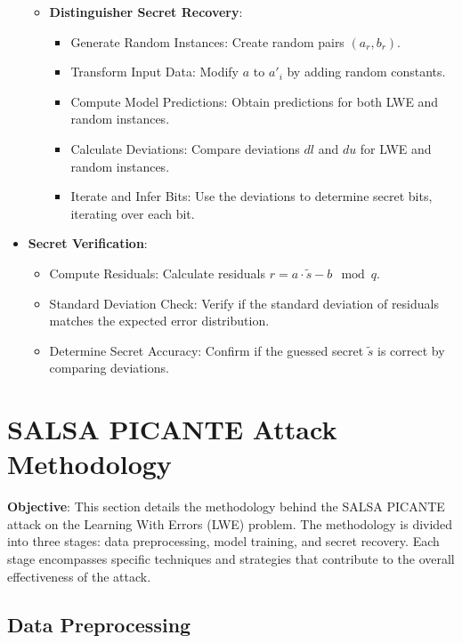 \documentclass{article}
\begin{document}
\begin{itemize}
\begin{itemize}
        \item \textbf{Distinguisher Secret Recovery}:
        \begin{itemize}
            \item Generate Random Instances: Create random pairs $(a_r, b_r)$.
            \item Transform Input Data: Modify $a$ to $a'_i$ by adding random constants.
            \item Compute Model Predictions: Obtain predictions for both LWE and random instances.
            \item Calculate Deviations: Compare deviations $dl$ and $du$ for LWE and random instances.
            \item Iterate and Infer Bits: Use the deviations to determine secret bits, iterating over each bit.
        \end{itemize}
    \end{itemize}
    \item \textbf{Secret Verification}:
    \begin{itemize}
        \item Compute Residuals: Calculate residuals $r = a \cdot \tilde{s} - b \mod q$.
        \item Standard Deviation Check: Verify if the standard deviation of residuals matches the expected error distribution.
        \item Determine Secret Accuracy: Confirm if the guessed secret $\tilde{s}$ is correct by comparing deviations.
    \end{itemize}
\end{itemize}

\section{SALSA PICANTE Attack Methodology}

\textbf{Objective}: This section details the methodology behind the SALSA PICANTE attack on the Learning With Errors (LWE) problem. The methodology is divided into three stages: data preprocessing, model training, and secret recovery. Each stage encompasses specific techniques and strategies that contribute to the overall effectiveness of the attack.

\subsection{Data Preprocessing}
\end{document}
